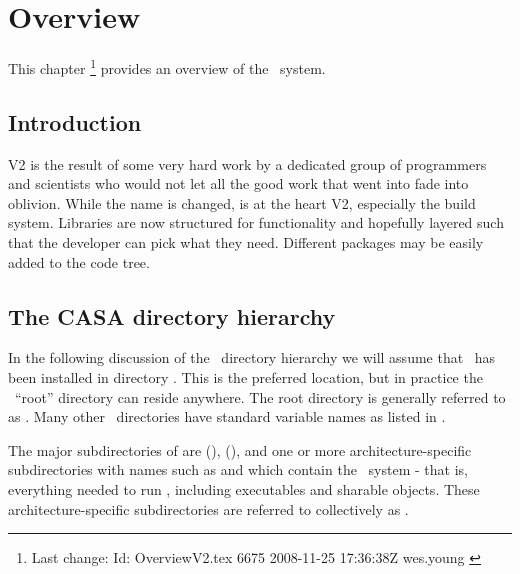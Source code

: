\chapter{Overview}
\label{Overview}


This chapter \footnote{Last change:
$ $Id: OverviewV2.tex 6675 2008-11-25 17:36:38Z wes.young $ $}
provides an overview of the \casa\ system.

\section{Introduction}
\casa V2 is the result of some very hard work by a dedicated group of programmers
and scientists who would not let all the good work that went into \casa fade into
oblivion. While the name is changed, \casa is at the heart \casa V2, especially the
build system.  Libraries are now structured for functionality and hopefully layered
such that the developer can pick what they need.  Different packages may be easily
added to the code tree.



\section{The CASA directory hierarchy}
\label{Directories}

In the following discussion of the \casa\ directory hierarchy we will
assume that \casa\ has been installed in directory .  This
is the preferred location, but in practice the \casa\ ``root'' directory
can reside anywhere.  The root directory is generally referred to as
.  Many other \casa\ directories have standard variable
names as listed in .

The major subdirectories of  are  (),
 (), and one or more architecture-specific
subdirectories with names such as  and 
which contain the \casa\ system - that is, everything needed to run \casa,
including executables and sharable objects.  These architecture-specific
subdirectories are referred to collectively as .


